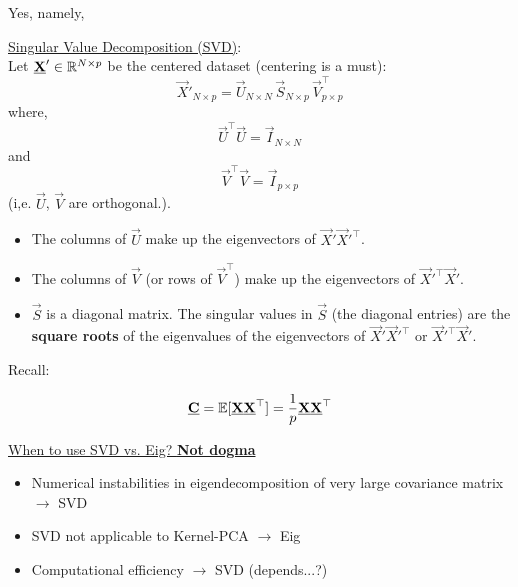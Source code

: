
Yes, namely,

\underline{Singular Value Decomposition (SVD)}:\\
Let $\underline{\mathbf{X}}' \in \mathbb{R}^{N \times p}$ be the centered dataset (centering is a must):
$$
\vec X'_{N \times p} = \vec U_{N \times N} \, \vec S_{N \times p} \, \vec V^\top_{{p \times p}}
$$
where,
$$
\vec U^\top \vec U = \vec I_{N \times N}
$$ and 
$$
\vec V^\top \vec V = \vec I_{p \times p}
$$ (i,e. $\vec U$, $\vec V$ are orthogonal.).
\begin{itemize}
\item The columns of $\vec U$ make up the eigenvectors of $\vec X'\vec X'^\top$.
\item The columns of $\vec V$ (or rows of $\vec V^\top$) make up the eigenvectors of $\vec X'^\top\vec X'$.
\item $\vec S$ is a diagonal matrix. The singular values in $\vec S$ (the diagonal entries) are the \textbf{square roots} of the  eigenvalues of the eigenvectors of $\vec X'\vec X'^\top$ or $\vec X'^\top\vec X'$.

\end{itemize}
Recall:

$$
\underline{\mathbf{C}} = \mathbb{E}[\underline{\mathbf{X}} \underline{\mathbf{X}}^\top] = \frac{1}{p} \underline{\mathbf{X}} \underline{\mathbf{X}}^\top
$$

\underline{When to use SVD vs. Eig? \textbf{Not dogma}}

\begin{itemize}

\item Numerical instabilities in eigendecomposition of very large covariance matrix $\rightarrow$ SVD
\item SVD not applicable to Kernel-PCA $\rightarrow$ Eig
\item Computational efficiency $\rightarrow$ SVD (depends...?)
\end{itemize}
